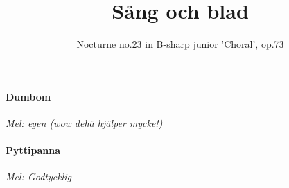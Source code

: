 \documentclass[12pt]{article}
\title{%
  Sång och blad }
\author{Nocturne no.23 in B-sharp junior 'Choral', op.73}
\date{}
\begin{document}
\layout


\maketitle
\thispagestyle{empty}
\renewcommand\thepage{%
\ifcase\value{page}%
43\or
87\or
16\or
7\or
42\or
33\or
103\or
71\or
17\else

\arabic{page}%
\fi}


\newpage
\noindent
\begin{minipage}{.475\textwidth}
	\noindent
	\paragraph*{Dumbom\\}
	\vspace{3px}
	\textit{Mel: egen (wow dehä hjälper mycke!)}\\
\end{minipage}%
\hspace{0.075\textwidth}
\noindent
\begin{minipage}{.45\textwidth}
	\noindent
	\paragraph*{Pyttipanna\\} 
	\vspace{3px}
	\textit{Mel: Godtycklig}\\
\end{minipage}
\end{document}
